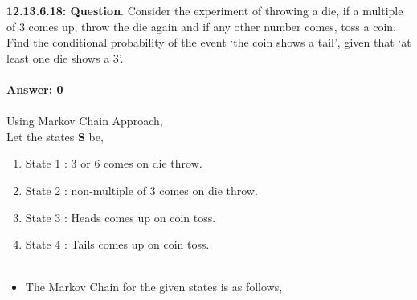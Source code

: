 \documentclass[journal,12pt,onecolumn]{IEEEtran}
\begin{document}
%
\textbf{12.13.6.18: Question}. Consider the experiment of throwing a die, if a multiple of 3 comes up, throw the die again and if any other number comes, toss a coin. Find the conditional probability
of the event ‘the coin shows a tail’, given that ‘at least one die shows a 3’.\\\\
\textbf{Answer: 0}\\\\
\solution
Using Markov Chain Approach,\\
Let the states \textbf{S} be,
\begin{enumerate}
\item State 1 : 3 or 6 comes on die throw.\\
\item State 2 : non-multiple of 3 comes on die throw.\\
\item State 3 : Heads comes up on coin toss.\\
\item State 4 : Tails comes up on coin toss.\\\\
\end{enumerate}
\begin{itemize}
\item The Markov Chain for the given states is as follows,
\end{itemize}
\begin{figure}[!ht]
	\centering
\begin{tikzpicture}[
    roundnode/.style={circle, draw=green!60, fill=green!5, very thick, minimum size=7mm},
    squarednode/.style={rectangle, draw=red!60, fill=red!5, very thick, minimum size=5mm},
    ->,>=stealth',auto,semithick,node distance=3cm,
    ]
    
	
\end{tikzpicture}
\end{figure}
\end{document}
